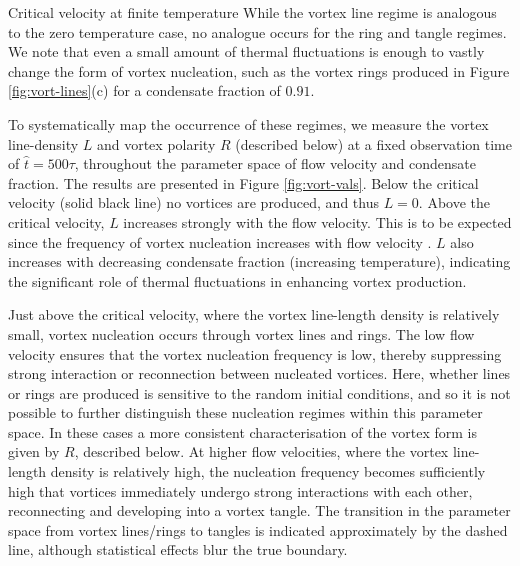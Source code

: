\begin{chapter}{\label{cha:nonequib}Critical velocity at finite temperature}
While the vortex line regime is analogous to the zero temperature case, no analogue occurs for the ring and tangle regimes.   We note that even a small amount of thermal fluctuations is enough to vastly change the form of vortex nucleation, such as the vortex rings produced in Figure \ref{fig:vort-lines}(c) for a condensate fraction of $0.91$.

To systematically map the occurrence of these regimes, we measure the vortex line-density $L$ and vortex polarity $R$ (described below) at a fixed observation time of $\hat{t}=500\tau$, throughout the parameter space of flow velocity and condensate fraction.  The results are presented in Figure \ref{fig:vort-vals}.  Below the critical velocity (solid black line) no vortices are produced, and thus $L=0$.  Above the critical velocity, $L$ increases strongly with the flow velocity.  This is to be expected since the frequency of vortex nucleation increases with flow velocity \cite{frisch92}.  $L$ also increases with decreasing condensate fraction (increasing temperature), indicating the significant role of thermal fluctuations in enhancing vortex production.

Just above the critical velocity, where the vortex line-length density is relatively small, vortex nucleation occurs through vortex lines and rings.  The low flow velocity ensures that the vortex nucleation frequency is low, thereby suppressing strong interaction or reconnection between nucleated vortices.  Here, whether lines or rings are produced is sensitive to the random initial conditions, and so it is not possible to further distinguish these nucleation regimes within this parameter space. In these cases a more consistent characterisation of the vortex form is given by $R$, described below.   At higher flow velocities, where the vortex line-length density is relatively high, the nucleation frequency becomes sufficiently high that vortices immediately undergo strong interactions with each other, reconnecting and developing into a vortex tangle.  The transition in the parameter space from vortex lines/rings to tangles is indicated approximately by the dashed line, although statistical effects blur the true boundary.


\end{chapter}
